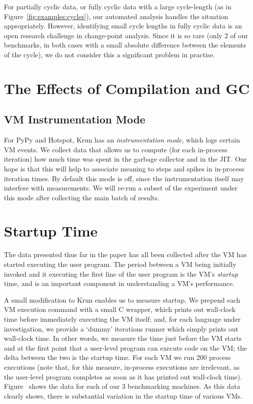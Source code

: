 \documentclass[preprint,numbers,10pt]{sigplanconf}
\newcommand{\krun}{Krun\xspace}
\begin{document}
For partially cyclic data, or fully cyclic data with a large cycle-length (as in
Figure~\ref{fig:examples:cycles}), our automated analysis handles the situation
appropriately. However, identifying small cycle lengths in fully cyclic data is
an open research challenge in change-point analysis. Since it is so rare (only 2
of our benchmarks, in both cases with a small absolute difference between the
elements of the cycle), we do not consider this a significant problem in practise.


\section{The Effects of Compilation and GC}
\label{sec:deepdive}

\subsection{VM Instrumentation Mode}

For PyPy and Hotspot, \krun has an \emph{instrumentation mode}, which logs certain
VM events. We collect data that allows us to compute (for each in-process
iteration) how much time was spent in the garbage collector and in the JIT.
Our hope is that this will help to associate meaning to
steps and spikes in in-process iteration times. By default this mode is off,
since the instrumentation itself may interfere with measurements.
We will re-run a subset of the experiment under this mode after collecting the
main batch of results.


\section{Startup Time}
\label{sec:startup}

The data presented thus far in the paper has all been collected after the VM has
started executing the user program. The period between a VM being initially
invoked and it executing the first line of the user program is the VM's \emph{startup} time,
and is an important component in understanding a VM's performance.

A small modification to \krun enables us to measure startup. We prepend each VM
execution command with a small C wrapper, which prints out wall-clock time
before immediately executing the VM itself; and, for each language under
investigation, we provide a `dummy' iterations runner which simply prints out
wall-clock time. In other words, we measure the time just before the VM starts
and at the first point that a user-level program can execute code on the VM; the
delta between the two is the startup time. For each VM we run 200 process
executions (note that, for this measure, in-process executions are irrelevant,
as the user-level program completes as soon as it has printed out wall-clock
time). Figure~ shows the data for each of our
3 benchmarking machines. As this data clearly shows, there is substantial
variation in the startup time of various VMs.
\end{document}
